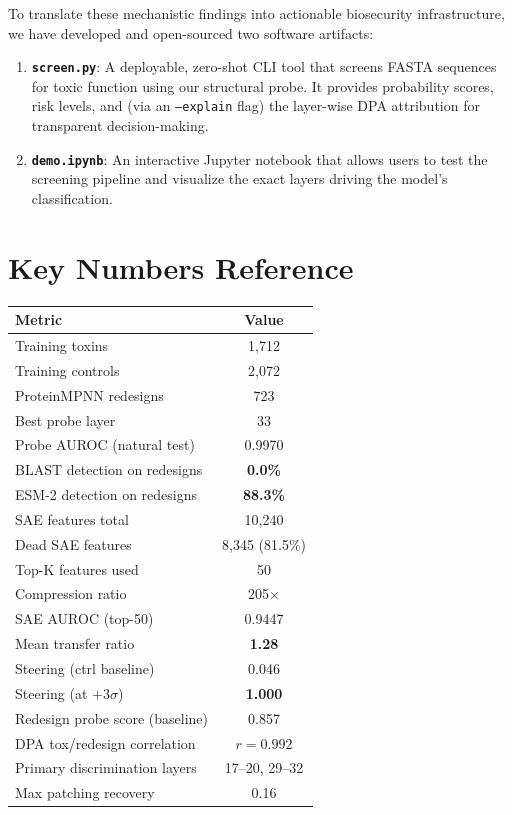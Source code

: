\documentclass[11pt,a4paper]{article}
\begin{document}
To translate these mechanistic findings into actionable biosecurity infrastructure, we have developed and open-sourced two software artifacts:
\begin{enumerate}
    \item \textbf{\texttt{screen.py}}: A deployable, zero-shot CLI tool that screens FASTA sequences for toxic function using our structural probe. It provides probability scores, risk levels, and (via an \texttt{--explain} flag) the layer-wise DPA attribution for transparent decision-making.
    \item \textbf{\texttt{demo.ipynb}}: An interactive Jupyter notebook that allows users to test the screening pipeline and visualize the exact layers driving the model's classification.
\end{enumerate}

\section*{Key Numbers Reference}

\begin{table}[H]
\centering
\begin{tabular}{lc}
\toprule
\textbf{Metric} & \textbf{Value} \\
\midrule
Training toxins & 1,712 \\
Training controls & 2,072 \\
ProteinMPNN redesigns & 723 \\
Best probe layer & 33 \\
Probe AUROC (natural test) & 0.9970 \\
BLAST detection on redesigns & \textbf{0.0\%} \\
ESM-2 detection on redesigns & \textbf{88.3\%} \\
SAE features total & 10,240 \\
Dead SAE features & 8,345 (81.5\%) \\
Top-K features used & 50 \\
Compression ratio & 205$\times$ \\
SAE AUROC (top-50) & 0.9447 \\
Mean transfer ratio & \textbf{1.28} \\
Steering (ctrl baseline) & 0.046 \\
Steering (at $+3\sigma$) & \textbf{1.000} \\
Redesign probe score (baseline) & 0.857 \\
DPA tox/redesign correlation & \textbf{$r = 0.992$} \\
Primary discrimination layers & 17--20, 29--32 \\
Max patching recovery & 0.16 \\
\bottomrule
\end{tabular}
\end{table}
\end{document}
